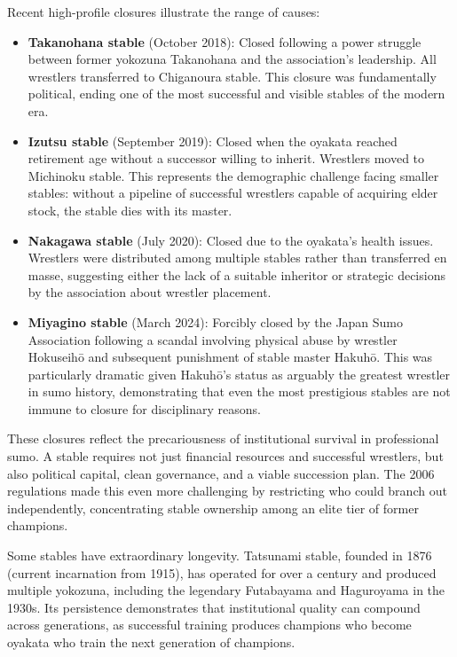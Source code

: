 Recent high-profile closures illustrate the range of causes:

\begin{itemize}
\item \textbf{Takanohana stable} (October 2018): Closed following a power struggle between former yokozuna Takanohana and the association's leadership. All wrestlers transferred to Chiganoura stable. This closure was fundamentally political, ending one of the most successful and visible stables of the modern era.
\item \textbf{Izutsu stable} (September 2019): Closed when the oyakata reached retirement age without a successor willing to inherit. Wrestlers moved to Michinoku stable. This represents the demographic challenge facing smaller stables: without a pipeline of successful wrestlers capable of acquiring elder stock, the stable dies with its master.
\item \textbf{Nakagawa stable} (July 2020): Closed due to the oyakata's health issues. Wrestlers were distributed among multiple stables rather than transferred en masse, suggesting either the lack of a suitable inheritor or strategic decisions by the association about wrestler placement.
\item \textbf{Miyagino stable} (March 2024): Forcibly closed by the Japan Sumo Association following a scandal involving physical abuse by wrestler Hokuseihō and subsequent punishment of stable master Hakuhō. This was particularly dramatic given Hakuhō's status as arguably the greatest wrestler in sumo history, demonstrating that even the most prestigious stables are not immune to closure for disciplinary reasons.
\end{itemize}

These closures reflect the precariousness of institutional survival in professional sumo. A stable requires not just financial resources and successful wrestlers, but also political capital, clean governance, and a viable succession plan. The 2006 regulations made this even more challenging by restricting who could branch out independently, concentrating stable ownership among an elite tier of former champions.

Some stables have extraordinary longevity. Tatsunami stable, founded in 1876 (current incarnation from 1915), has operated for over a century and produced multiple yokozuna, including the legendary Futabayama and Haguroyama in the 1930s. Its persistence demonstrates that institutional quality can compound across generations, as successful training produces champions who become oyakata who train the next generation of champions.


